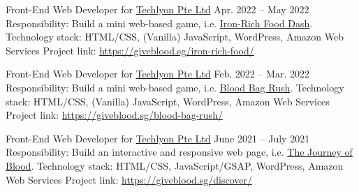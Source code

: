\begin{cventries}

\cventry
{Front-End Web Developer for \href{https://helloakin.com/}{Techlyon Pte Ltd}} %
{} %
{} %
{Apr. 2022 -- May 2022} %
{ %
Responsibility: Build a mini web-based game, i.e. \href{https://giveblood.sg/iron-rich-food/}{Iron-Rich Food Dash}.
\linebreak
Technology stack: HTML/CSS, (Vanilla) JavaScript, WordPress, Amazon Web Services
\linebreak
Project link: \href{https://giveblood.sg/iron-rich-food/}{https://giveblood.sg/iron-rich-food/}
}


\cventry
{Front-End Web Developer for \href{https://helloakin.com/}{Techlyon Pte Ltd}} %
{} %
{} %
{Feb. 2022 -- Mar. 2022} %
{ %
Responsibility: Build a mini web-based game, i.e. \href{https://giveblood.sg/blood-bag-rush/}{Blood Bag Rush}.
\linebreak
Technology stack: HTML/CSS, (Vanilla) JavaScript, WordPress, Amazon Web Services
\linebreak
Project link: \href{https://giveblood.sg/blood-bag-rush/}{https://giveblood.sg/blood-bag-rush/}
}


\cventry
{Front-End Web Developer for \href{https://helloakin.com/}{Techlyon Pte Ltd}} %
{} %
{} %
{June 2021 -- July 2021} %
{ %
Responsibility: Build an interactive and responsive web page, i.e. \href{https://giveblood.sg/discover/}{The Journey of Blood}.
\linebreak
Technology stack: HTML/CSS, JavaScript/GSAP, WordPress, Amazon Web Services
\linebreak
Project link: \href{https://giveblood.sg/discover/}{https://giveblood.sg/discover/}
}


\end{cventries}
